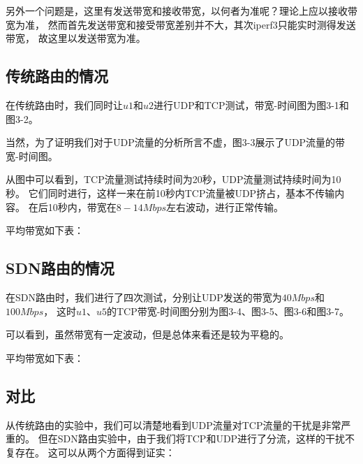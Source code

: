 另外一个问题是，这里有发送带宽和接收带宽，以何者为准呢？理论上应以接收带宽为准，
然而首先发送带宽和接受带宽差别并不大，其次iperf3只能实时测得发送带宽，
故这里以发送带宽为准。

\subsection{传统路由的情况}

在传统路由时，我们同时让$u1$和$u2$进行UDP和TCP测试，带宽-时间图为图3-1和图3-2。

当然，为了证明我们对于UDP流量的分析所言不虚，图3-3展示了UDP流量的带宽-时间图。

从图中可以看到，TCP流量测试持续时间为20秒，UDP流量测试持续时间为10秒。
它们同时进行，这样一来在前10秒内TCP流量被UDP挤占，基本不传输内容。
在后10秒内，带宽在$8-14Mbps$左右波动，进行正常传输。







平均带宽如下表：



\subsection{SDN路由的情况}

在SDN路由时，我们进行了四次测试，分别让UDP发送的带宽为$40Mbps$和$100Mbps$，
这时$u1$、$u5$的TCP带宽-时间图分别为图3-4、图3-5、图3-6和图3-7。









可以看到，虽然带宽有一定波动，但是总体来看还是较为平稳的。

平均带宽如下表：



\subsection{对比}

从传统路由的实验中，我们可以清楚地看到UDP流量对TCP流量的干扰是非常严重的。
但在SDN路由实验中，由于我们将TCP和UDP进行了分流，这样的干扰不复存在。
这可以从两个方面得到证实：

